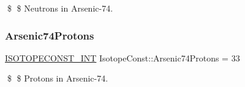 \$ \$ Neutrons in Arsenic-\/74. \mbox{\label{group___isotope_const-_arsenic-_as74_ga3582bcdbb4372a7b6c67b20985cb52e9}} 
\subsubsection{\texorpdfstring{Arsenic74\+Protons}{Arsenic74Protons}}
{\footnotesize\ttfamily \mbox{\hyperlink{group___isotope_const-_macros_ga5f18360b3e99483a35c32d789e62621c}{I\+S\+O\+T\+O\+P\+E\+C\+O\+N\+S\+T\+\_\+\+I\+NT}} Isotope\+Const\+::\+Arsenic74\+Protons = 33}

\$ \$ Protons in Arsenic-\/74. 